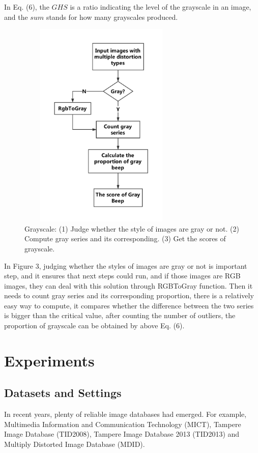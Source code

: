In Eq. (6), the $GHS$ is a ratio indicating the level of the grayscale in an image, and the $sum$ stands for how many grayscales produced.
\begin{figure}
\centering
\includegraphics[height=10cm, width=8cm]{images/Gray_Beep.eps}
\caption{Grayscale:  (1) Judge whether the style of images are gray or not.  (2) Compute gray series and its corresponding. (3) Get the scores of grayscale. }
\label{3}
\end{figure}
In Figure 3, judging whether the styles of images are gray or not is important step, and it ensures that next steps could run, and if those images are RGB images, they can deal with this solution through RGBToGray function. Then it needs to count gray series and its corresponding proportion, there is a relatively easy way to compute, it compares whether the difference between the two series is bigger than the critical value, after counting the number of outliers, the proportion of grayscale can be obtained by above Eq. (6). 


\section{Experiments}
\subsection{Datasets and Settings}

In recent years, plenty of reliable image databases had emerged. For example, Multimedia Information and Communication Technology (MICT), Tampere Image Database (TID2008), Tampere Image Database 2013 (TID2013) and Multiply Distorted Image Database (MDID).

